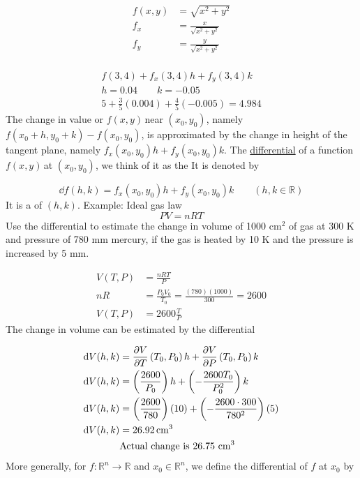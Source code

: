 \documentclass{article}
\newcommand{\n}{\leavevmode \newline} %
\newcommand{\nn}{\leavevmode \newline \newline} %
\newcommand{\R}{\mathbb{R}} %
\newcommand{\fxy}{$f(x,y)\,$} %
\numberwithin{equation}{subsection} %
\begin{document}
\begin{equation}
    \begin{split}
        f(x,y)&=\sqrt{x^2+y^2}\\
        f_x&=\frac{x}{\sqrt{x^2+y^2}}\\
        f_y&=\frac{y}{\sqrt{x^2+y^2}}\\
    \end{split}
\end{equation}

\begin{equation}
    \begin{split}
        f(3,4)+f_x(3,4)h+f_y(3,4)k\\
        h=0.04 \qquad k=-0.05\\
        5+\frac{3}{5}(0.004)+\frac{4}{5}(-0.005) = 4.984
    \end{split}
\end{equation}
\n
The change in value or \fxy near $(x_0,y_0)$, namely $f(x_0+h,y_0+k)-f(x_0,y_0)$, is approximated by the change in height of the tangent plane, namely $f_x(x_0,y_0)h+f_y(x_0,y_0)k$.
\nn
The \underline{differential} of a function \fxy at $(x_0,y_0)$, we think of it as the \say{approximate change in \fxy.} It is denoted by

\begin{equation}
    \dd f(h,k)=f_x(x_0,y_0)h+f_y(x_0,y_0)k \qquad (h,k\in\R)
\end{equation}
\n
It is a  of $(h,k)$.
\nn
Example: Ideal gas law
\begin{equation}
    PV=nRT
\end{equation}
\n
Use the differential to estimate the change in volume of 1000 cm$^2$ of gas at 300 K and pressure of 780 mm mercury, if the gas is heated by 10 K and the pressure is increased by 5 mm.

\begin{equation}
    \begin{split}
        V(T,P)&=\frac{nRT}{P}\\
        nR&=\frac{P_0V_0}{T_0}=\frac{(780)(1000)}{300}=2600\\
        V(T,P)&=2600\frac{T}{P}
    \end{split}
\end{equation}
\n
The change in volume can be estimated by the differential

\begin{equation}
    \begin{split}
        \dd V(h,k)&=\pdv{V}{T}\left(T_0,P_0\right)h+ \pdv{V}{P}\left(T_0,P_0\right) k\\
        \dd V(h,k)&=\left(\frac{2600}{P_0}\right)h+\left(-\frac{2600 T_0}{P_0^2}\right)k\\
        \dd V(h,k)&=\left(\frac{2600}{780}\right)(10)+\left(-\frac{2600\cdot300}{780^2}\right)(5)\\
        \dd V(h,k)&=26.92\,\si{\centi\meter}^3\\
        &\text{Actual change is 26.75 cm}^3
    \end{split}
\end{equation}
\n
More generally, for $f:\R^n\to\R$ and $x_0\in\R^n$, we define the differential of $f$ at $x_0$ by
\end{document}
